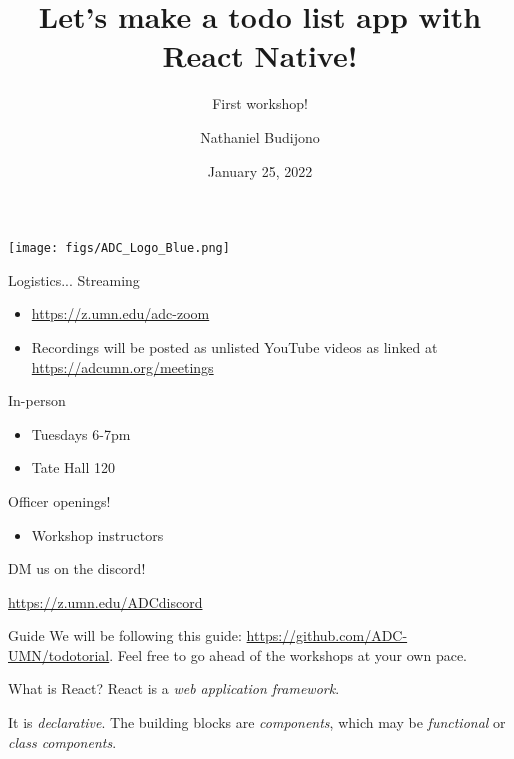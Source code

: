\documentclass{beamer}
\title{Let's make a todo list app with React Native!}
\subtitle{First workshop!}
\author{Nathaniel Budijono}
\date{January 25, 2022}
\institute{UMN ADC}
\begin{document}
\begin{frame}
    \titlepage
    \texttt{[image: figs/ADC\_Logo\_Blue.png]}
\end{frame}

\begin{frame}{Logistics...}
	Streaming
	\begin{itemize}
		\item \href{https://z.umn.edu/adc-zoom}{https://z.umn.edu/adc-zoom}
		\item Recordings will be posted as unlisted YouTube videos as linked at \href{https://adcumn.org/meetings}{https://adcumn.org/meetings}
	\end{itemize}

	\bigskip\pause

	In-person
	\begin{itemize}
		\item Tuesdays 6-7pm
		\item Tate Hall 120
	\end{itemize}
\end{frame}

\begin{frame}{Officer openings!}
	\begin{itemize}
		\item Workshop instructors
	\end{itemize}

	\bigskip

	DM us on the discord!

	\bigskip

	\href{https://z.umn.edu/ADCdiscord}{https://z.umn.edu/ADCdiscord}
\end{frame}

\begin{frame}{Guide}
	We will be following this guide: \href{https://github.com/ADC-UMN/todotorial}{https://github.com/ADC-UMN/todotorial}. Feel free to go ahead of the workshops at your own pace.
\end{frame}

\begin{frame}{What is React?}
	React is a \emph{web application framework}. 

	\bigskip\pause
	
	It is \emph{declarative}. The building blocks are \emph{components}, which may be \emph{functional} or \emph{class components}.
\end{frame}
\end{document}
